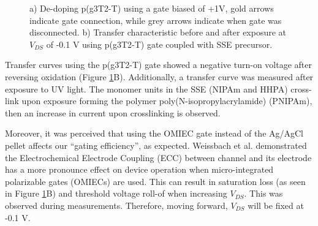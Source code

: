 \begin{figure}[ht]
    \centering
    \caption[Electrochemical de-doping of oxidized p(g3T2-T) OECT]{a) De-doping p(g3T2-T) using a gate biased of +1V, gold arrows indicate gate connection, while grey arrows indicate when gate was disconnected. b) Transfer characteristic before and after exposure at $V_{DS}$ of -0.1 V using p(g3T2-T) gate coupled with SSE precursor.}
    \label{fig:revox2}
\end{figure}

Transfer curves using the p(g3T2-T) gate showed a negative turn-on voltage after reversing oxidation (Figure \ref{fig:revox2}B). Additionally, a transfer curve was measured after exposure to UV light. The monomer units in the SSE (NIPAm and HHPA) cross-link upon exposure forming the polymer poly(N-isopropylacrylamide) (PNIPAm), then an increase in current upon crosslinking is observed.

Moreover, it was perceived that using the OMIEC gate instead of the Ag/AgCl pellet affects our ``gating efficiency'', as expected. Weissbach et al.  \cite{weissbachUnravelingElectrochemicalElectrode2023} demonstrated the Electrochemical Electrode Coupling (ECC) between channel and its electrode has a more pronounce effect on device operation when micro-integrated polarizable gates (OMIECs) are used. This can result in saturation loss (as seen in Figure \ref{fig:revox2}B) and threshold voltage roll-of when increasing $V_{DS}$. This was observed during measurements. Therefore, moving forward, $V_{DS}$ will be fixed at -0.1 V.

